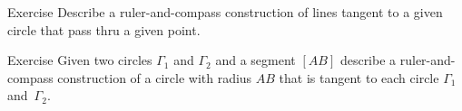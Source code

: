 \begin{thm}{Exercise}\label{ex:tangent}
Describe a ruler-and-compass construction of lines tangent to a given circle that pass thru a given point.
\end{thm}

\begin{thm}{Exercise}\label{ex:tangent-circle}
Given two circles $\Gamma_1$ and $\Gamma_2$ and a segment $[AB]$
describe a ruler-and-compass construction of a circle with radius $AB$
that is tangent to each circle $\Gamma_1$ and~$\Gamma_2$.
\end{thm}


